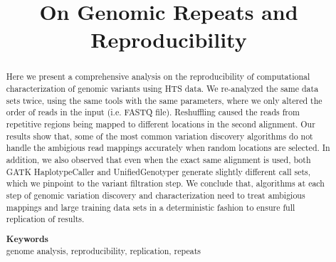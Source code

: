 \documentclass[10pt,a4paper]{article}
\date{}
\newcommand {\junk}[1]{}
\def\keywords#1{\begin{center}{\bf Keywords}\\{#1}\end{center}}
\def\titulo#1{\title{#1}}
\begin{document}
\titulo{On Genomic Repeats and Reproducibility}

\author[1]{}

\maketitle
\thispagestyle{empty}


\begin{abstract}
\junk{
High throughput sequencing (HTS) technologies have been transforming biological research since their inception. More recent projects such as ClinSeq, now explore the possibility
of using HTS in the clinic as medical tests. However, the reproducibility of HTS-based analysis is yet to be proven, especially within the complex regions of the genome.
Although it is known that the HTS platforms do not yet produce perfect data, and every sequencing experiment may show different error profile, there is no study that characterize
the effects of read mapping ambiguity within repeats and duplications. 
}

Here we present a comprehensive analysis on the reproducibility of computational characterization of genomic variants using HTS data. We re-analyzed the same data sets twice, using the same tools with the
same parameters, where we only altered the order of reads in the input (i.e. FASTQ file). Reshuffling caused the reads from repetitive regions being mapped to different locations in the second alignment.
Our results show that, some of the most common variation discovery algorithms
do not handle the ambigious read mappings accurately when random locations are selected. In addition, we also observed that even when the exact same alignment is used, both GATK HaplotypeCaller and UnifiedGenotyper generate slightly different call sets, which we pinpoint to the variant filtration step. We conclude that, algorithms at each step of genomic variation
discovery and characterization need to treat ambigious mappings and large training data sets in a deterministic fashion to ensure full replication of results.

\keywords{genome analysis, reproducibility, replication, repeats}
\end{abstract}
\end{document}
